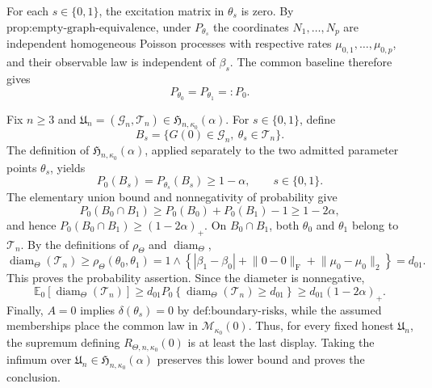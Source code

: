 For each \(s\in\{0,1\}\), the excitation matrix in \(\theta_s\) is zero. By \(\text{prop:empty-graph-equivalence}\), under \(P_{\theta_s}\) the coordinates \(N_1,\ldots,N_p\) are independent homogeneous Poisson processes with respective rates \(\mu_{0,1},\ldots,\mu_{0,p}\), and their observable law is independent of \(\beta_s\). The common baseline therefore gives
\[
 P_{\theta_0}=P_{\theta_1}=:P_0.
\]

Fix \(n\geq3\) and \(\mathfrak U_n=(\mathcal G_n,\mathcal T_n)\in\mathfrak H_{n,\kappa_0}(\alpha)\). For \(s\in\{0,1\}\), define
\[
 B_s=\{G(0)\in\mathcal G_n,\ \theta_s\in\mathcal T_n\}.
\]
The definition of \(\mathfrak H_{n,\kappa_0}(\alpha)\), applied separately to the two admitted parameter points \(\theta_s\), yields
\[
 P_0(B_s)=P_{\theta_s}(B_s)\geq1-\alpha,
 \qquad s\in\{0,1\}.
\]
The elementary union bound and nonnegativity of probability give
\[
 P_0(B_0\cap B_1)
 \geq P_0(B_0)+P_0(B_1)-1
 \geq1-2\alpha,
\]
and hence \(P_0(B_0\cap B_1)\geq(1-2\alpha)_+\). On \(B_0\cap B_1\), both \(\theta_0\) and \(\theta_1\) belong to \(\mathcal T_n\). By the definitions of \(\rho_{\Theta}\) and \(\operatorname{diam}_{\Theta}\),
\[
 \operatorname{diam}_{\Theta}(\mathcal T_n)
 \geq \rho_{\Theta}(\theta_0,\theta_1)
 =1\wedge\left\{|\beta_1-\beta_0|+\lVert0-0\rVert_{\mathrm F}+\lVert\mu_0-\mu_0\rVert_2\right\}
 =d_{01}.
\]
This proves the probability assertion. Since the diameter is nonnegative,
\[
 \mathbb E_0\!\left[\operatorname{diam}_{\Theta}(\mathcal T_n)\right]
 \geq d_{01}P_0\!\left\{\operatorname{diam}_{\Theta}(\mathcal T_n)\geq d_{01}\right\}
 \geq d_{01}(1-2\alpha)_+.
\]
Finally, \(A=0\) implies \(\delta(\theta_s)=0\) by \(\text{def:boundary-risks}\), while the assumed memberships place the common law in \(\mathcal M_{\kappa_0}(0)\). Thus, for every fixed honest \(\mathfrak U_n\), the supremum defining \(R_{\Theta,n,\kappa_0}(0)\) is at least the last display. Taking the infimum over \(\mathfrak U_n\in\mathfrak H_{n,\kappa_0}(\alpha)\) preserves this lower bound and proves the conclusion.